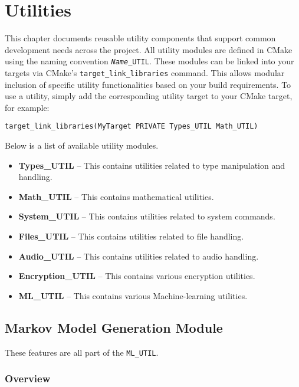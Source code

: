 \chapter{Utilities}
\label{chap:utilities}

This chapter documents reusable utility components that support common development needs across the project. All utility modules are defined in CMake using the naming convention \texttt{\textit{Name}\_UTIL}. These modules can be linked into your targets via CMake's \texttt{target\_link\_libraries} command. This allows modular inclusion of specific utility functionalities based on your build requirements. To use a utility, simply add the corresponding utility target to your CMake target, for example:
\begin{lstlisting}[style=cppstyle]
target_link_libraries(MyTarget PRIVATE Types_UTIL Math_UTIL)
\end{lstlisting}
Below is a list of available utility modules.
\begin{itemize}\itemsep0em
	\item \textbf{Types\_UTIL} – This contains utilities related to type manipulation and handling.
	\item \textbf{Math\_UTIL} – This contains mathematical utilities.
	\item \textbf{System\_UTIL} – This contains utilities related to system commands.
	\item \textbf{Files\_UTIL} – This contains utilities related to file handling.
	\item \textbf{Audio\_UTIL} – This contains utilities related to audio handling.
	\item \textbf{Encryption\_UTIL} – This contains various encryption utilities.
	\item \textbf{ML\_UTIL} – This contains various Machine-learning utilities.
\end{itemize}









\section{Markov Model Generation Module}

These features are all part of the \texttt{ML\_UTIL}.

\subsection{Overview}

